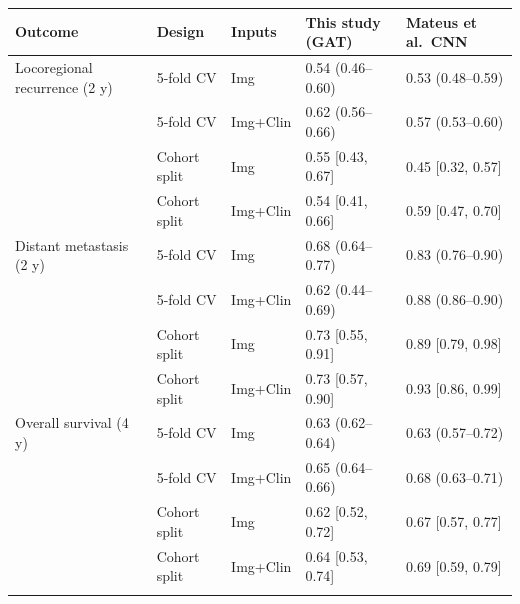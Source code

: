 \begin{tabular}{@{}lllll@{}}
\toprule
Outcome & Design & Inputs & This study (GAT) & Mateus et al.\ CNN \\
\midrule
Locoregional recurrence (2 y) & 5-fold CV & Img & 0.54 (0.46--0.60) & 0.53 (0.48--0.59) \\
 & 5-fold CV & Img+Clin & 0.62 (0.56--0.66) & 0.57 (0.53--0.60) \\
 & Cohort split & Img & 0.55 [0.43, 0.67] & 0.45 [0.32, 0.57] \\
 & Cohort split & Img+Clin & 0.54 [0.41, 0.66] & 0.59 [0.47, 0.70] \\
\midrule
Distant metastasis (2 y) & 5-fold CV & Img & 0.68 (0.64--0.77) & 0.83 (0.76--0.90) \\
 & 5-fold CV & Img+Clin & 0.62 (0.44--0.69) & 0.88 (0.86--0.90) \\
 & Cohort split & Img & 0.73 [0.55, 0.91] & 0.89 [0.79, 0.98] \\
 & Cohort split & Img+Clin & 0.73 [0.57, 0.90] & 0.93 [0.86, 0.99] \\
\midrule
Overall survival (4 y) & 5-fold CV & Img & 0.63 (0.62--0.64) & 0.63 (0.57--0.72) \\
 & 5-fold CV & Img+Clin & 0.65 (0.64--0.66) & 0.68 (0.63--0.71) \\
 & Cohort split & Img & 0.62 [0.52, 0.72] & 0.67 [0.57, 0.77] \\
 & Cohort split & Img+Clin & 0.64 [0.53, 0.74] & 0.69 [0.59, 0.79] \\
\botrule
\end{tabular}
